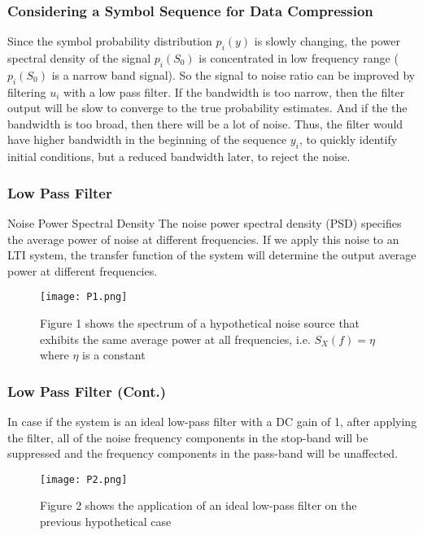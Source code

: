 \documentclass{beamer}
\begin{document}
\begin{frame}
\frametitle{Considering a Symbol Sequence for Data Compression}
Since the symbol probability distribution $p_i(y)$ is slowly changing, the power spectral density of the signal $p_i(S_0)$ is concentrated in low frequency range ($p_i(S_0)$ is a narrow band signal). \newline So the signal to noise ratio can be improved by filtering $u_i$ with a low pass filter. \newline If the bandwidth is too narrow, then the filter output will be slow to converge to the true probability estimates. \newline And if the the bandwidth is too broad, then there will be a lot of noise. \newline Thus, the filter would have higher bandwidth in the beginning of the sequence $y_i$, to quickly identify initial conditions, but a reduced bandwidth later, to reject the noise.
\end{frame}

\begin{frame}
\frametitle{Low Pass Filter}
\begin{block}{Noise Power Spectral Density}
The noise power spectral density (PSD) specifies the average power of noise at different frequencies.
If we apply this noise to an LTI system, the transfer function of the system will determine the output average power at different frequencies. 
\end{block}
\begin{figure}
\texttt{[image: P1.png]}
\caption{Figure 1 shows the spectrum of a hypothetical noise source that exhibits the same average power at all frequencies, i.e. $S_X(f)=\eta$ where $\eta$ is a constant}
\end{figure}
\end{frame}

\begin{frame}
\frametitle{Low Pass Filter (Cont.)}
In case if the system is an ideal low-pass filter with a DC gain of 1, after applying the filter, all of the noise frequency components in the stop-band will be suppressed and the frequency components in the pass-band will be unaffected.
\begin{figure}
\texttt{[image: P2.png]}
\caption{Figure 2 shows the application of an ideal low-pass filter on the previous hypothetical case}
\end{figure}
\end{frame}
\end{document}
